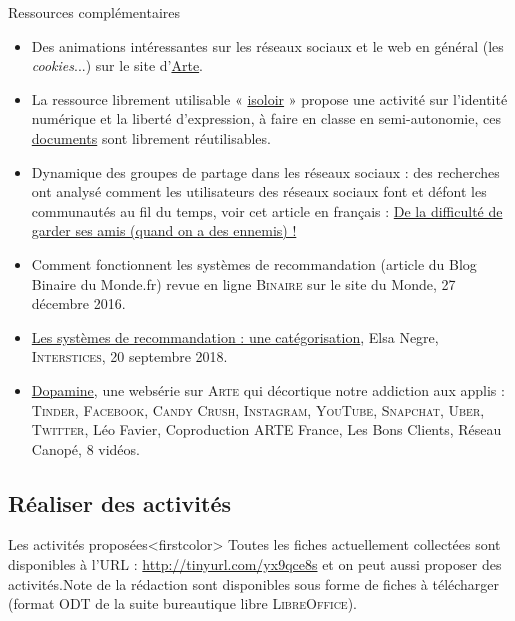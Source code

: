 \begin{gofurther}{Ressources complémentaires}
\vspace{2pt}
\begin{itemize}\jazzitem
\item Des animations intéressantes sur les réseaux sociaux et le web en général (les \textit{cookies}...) sur le site d'\href{https://donottrack-doc.com/fr/episodes/}{Arte}.
\item La ressource librement utilisable « \href{https://www.isoloir.net/}{isoloir} » propose une activité sur l'identité numérique et la liberté d'expression, à faire en classe en semi-autonomie, ces \href{https://pixees.fr/informatique-et-societe-du-jeu-serieux-au-document-pedagogique/}{documents} sont librement réutilisables.
\item Dynamique des groupes de partage dans les réseaux sociaux : des recherches ont analysé comment les utilisateurs des réseaux sociaux font et défont les communautés au fil du temps, voir cet article en français : \href{https://hal.archives-ouvertes.fr/hal-00815680}{De la difficulté de garder ses amis (quand on a des ennemis) !}
\item Comment fonctionnent les systèmes de recommandation (article du Blog Binaire du Monde.fr) revue en ligne \textsc{Binaire} sur le site du Monde, 27 décembre 2016.
\item \href{https://interstices.info/les-systemes-de-recommandation-categorisation/}{Les systèmes de recommandation : une catégorisation}, Elsa Negre, \textsc{Interstices}, 20 septembre 2018.
\item \href{https://www.arte.tv/fr/videos/RC-017841/dopamine/}{Dopamine}, une websérie sur \textsc{Arte} qui décortique notre addiction aux applis : \textsc{Tinder}, \textsc{Facebook}, \textsc{Candy Crush}, \textsc{Instagram}, \textsc{YouTube}, \textsc{Snapchat}, \textsc{Uber}, \textsc{Twitter}, Léo Favier, Coproduction ARTE France, Les Bons Clients, Réseau Canopé, 8 vidéos.
\end{itemize}
\end{gofurther}


\subsection[Réaliser des activités]{Réaliser des activités}
\label{sub:IX.3.2}


Les activités proposées\caution[t]<firstcolor>{%
Toutes les fiches actuellement collectées sont disponibles à l'URL : \url{http://tinyurl.com/yx9qce8s} et on peut aussi proposer des activités.}{Note de la rédaction}
sont disponibles sous forme de fiches à télécharger (format ODT de la suite bureautique libre \textsc{LibreOffice}).

